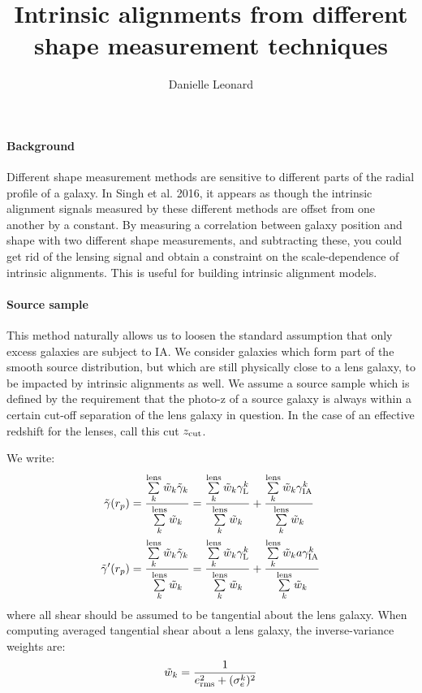 \documentclass[onecolumn,amsmath,aps,fleqn, superscriptaddress]{revtex4}
\begin{document}
\title{Intrinsic alignments from different shape measurement techniques}

\author{Danielle Leonard}

\maketitle

\paragraph*{Background} Different shape measurement methods are sensitive to different parts of the radial profile of a galaxy. In Singh et al. 2016, it appears as though the intrinsic alignment signals measured by these different methods are offset from one another by a constant. By measuring a correlation between galaxy position and shape with two different shape measurements, and subtracting these, you could get rid of the lensing signal and obtain a constraint on the scale-dependence of intrinsic alignments. This is useful for building intrinsic alignment models.

\paragraph*{Source sample} This method naturally allows us to loosen the standard assumption that only excess galaxies are subject to IA. We consider galaxies which form part of the smooth source distribution, but which are still physically close to a lens galaxy, to be impacted by intrinsic alignments as well. We assume a source sample which is defined by the requirement that the photo-z of a source galaxy is always within a certain cut-off separation of the lens galaxy in question. In the case of an effective redshift for the lenses, call this cut $z_{\rm cut}$.

We write:
\begin{align}
\tilde{\gamma}(r_p) &= \frac{\sum\limits_{k}^{\rm lens} \tilde{w}_k \tilde{\gamma}_k}{\sum\limits_{k}^{\rm lens} \tilde{w}_k} = \frac{\sum\limits_{k}^{\rm lens} \tilde{w}_k \gamma_{\rm L}^k}{\sum\limits_{k}^{\rm lens} \tilde{w}_k}+\frac{\sum\limits_{k}^{\rm lens} \tilde{w}_k \gamma_{\rm IA}^k}{\sum\limits_{k}^{\rm lens} \tilde{w}_k} \nonumber \\ 
\tilde{\gamma}'(r_p) &= \frac{\sum\limits_{k}^{\rm lens} \tilde{w}_k \tilde{\gamma}_k}{\sum\limits_{k}^{\rm lens} \tilde{w}_k} = \frac{\sum\limits_{k}^{\rm lens} \tilde{w}_k \gamma_{\rm L}^k}{\sum\limits_{k}^{\rm lens} \tilde{w}_k}+\frac{\sum\limits_{k}^{\rm lens} \tilde{w}_k a \gamma_{\rm IA}^k}{\sum\limits_{k}^{\rm lens} \tilde{w}_k} 
\label{full_both}
\end{align}
where all shear should be assumed to be tangential about the lens galaxy. When computing averaged tangential shear about a lens galaxy, the inverse-variance weights are:
\begin{equation}
\tilde{w}_k = \frac{1}{e_{\rm rms}^2 + (\sigma_e^k)^2}
\label{weights}
\end{equation}
\end{document}
